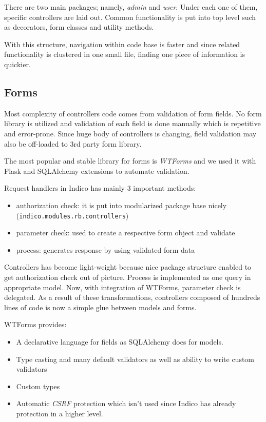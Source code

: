 There are two main packages; namely, \textit{admin} and \textit{user}. Under each one of them, specific controllers are laid out. Common functionality is put into top level such as decorators, form classes and utility methods.

With this structure, navigation within code base is faster and since related functionality is clustered in one small file, finding one piece of information is quickier.

\subsection{Forms}

Most complexity of controllers code comes from validation of form fields. No form library is utilized and validation of each field is done manually which is repetitive and error-prone. Since huge body of controllers is changing, field validation may also be off-loaded to 3rd party form library.

The most popular and stable library for forms is \textit{WTForms} and we used it with Flask and SQLAlchemy extensions to automate validation.

Request handlers in Indico has mainly 3 important methods:
\begin{itemize}
  \item authorization check: it is put into modularized package base nicely (\texttt{indico.modules.rb.controllers})
  \item parameter check: used to create a respective form object and validate
  \item process: generates response by using validated form data
\end{itemize}

Controllers has become light-weight because nice package structure enabled to get authorization check out of picture. Process is implemented as one query in appropriate model. Now, with integration of WTForms, parameter check is delegated. As a result of these transformations, controllers composed of hundreds lines of code is now a simple glue between models and forms.

WTForms provides:
\begin{itemize}
  \item A declarative language for fields as SQLAlchemy does for models.
  \item Type casting and many default validators as well as ability to write custom validators
  \item Custom types
  \item Automatic \textit{CSRF} protection which isn't used since Indico has already protection in a higher level.
\end{itemize}

